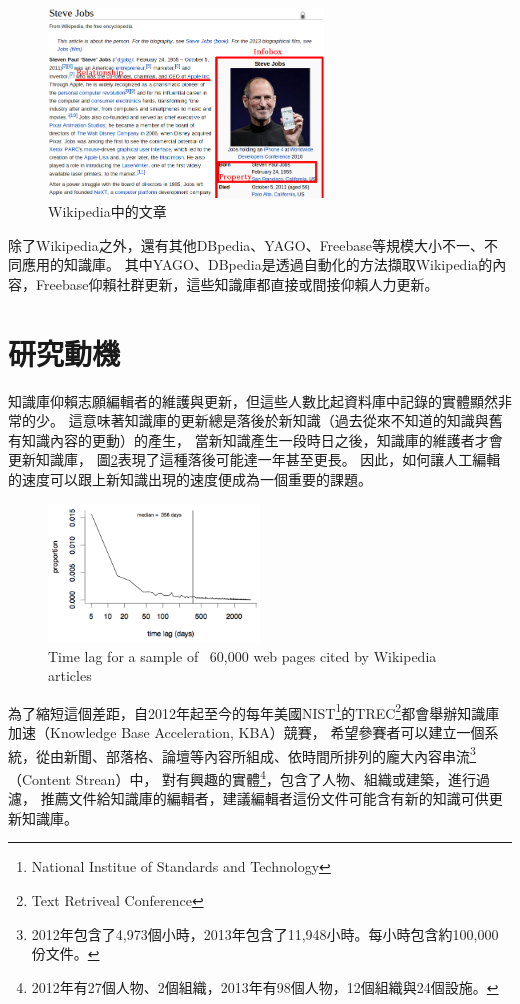 \begin{figure}
\centering
\includegraphics[width=0.65\textwidth]{images/01-wiki-as-kb}
\caption{Wikipedia中的文章}
\label{i:wiki}
\end{figure}

除了Wikipedia之外，還有其他DBpedia\cite{dbpedia}、YAGO\cite{yago}、Freebase\cite{freebase}等規模大小不一、不同應用的知識庫。
其中YAGO、DBpedia是透過自動化的方法擷取Wikipedia的內容，Freebase仰賴社群更新，這些知識庫都直接或間接仰賴人力更新。  %

%
%
\section{研究動機}
知識庫仰賴志願編輯者的維護與更新，但這些人數比起資料庫中記錄的實體顯然非常的少。
這意味著知識庫的更新總是落後於新知識（過去從來不知道的知識與舊有知識內容的更動）的產生，
當新知識產生一段時日之後，知識庫的維護者才會更新知識庫，
圖\ref{i:wikicitenews}表現了這種落後可能達一年甚至更長。
因此，如何讓人工編輯的速度可以跟上新知識出現的速度便成為一個重要的課題。

\begin{figure}
    \centering
    \includegraphics[width=0.5\textwidth]{images/01-wiki-cite-delay}
    \caption{Time lag for a sample of ~60,000 web pages cited by Wikipedia articles\cite{kba2012} }
    \label{i:wikicitenews}
\end{figure}

為了縮短這個差距，自2012年起至今的每年美國NIST\footnote{National Institue of Standards and Technology}的TREC\footnote{Text Retriveal Conference}都會舉辦知識庫加速（Knowledge Base Acceleration, KBA）競賽，
希望參賽者可以建立一個系統，從由新聞、部落格、論壇等內容所組成、依時間所排列的龐大內容串流\footnote{2012年包含了4,973個小時，2013年包含了11,948小時。\cite{kba2013}每小時包含約100,000份文件。}（Content Strean）中，
對有興趣的實體\footnote{2012年有27個人物、2個組織，2013年有98個人物，12個組織與24個設施。}，包含了人物、組織或建築，進行過濾，
推薦文件給知識庫的編輯者，建議編輯者這份文件可能含有新的知識可供更新知識庫。

